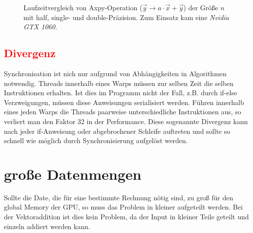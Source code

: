 		\begin{figure}[h]
  		\centering
  		\caption[Axpy mit verschiedenen Präzisionen]{Laufzeitvergleich von Axpy-Operation ($\vec{y}\rightarrow a\cdot\vec{x}+\vec{y}$) der Grö\ss e $n$ mit half, single- und double-Präzision. Zum Einsatz kam eine \textit{Nvidia GTX 1060}.}
  		\label{fig3:axpy}
		\end{figure}
		
		
		\subsection*{\textcolor{red}{Divergenz}}
		Synchronisation ist nich nur aufgrund von Abhängigkeiten in Algorithmen notwendig. \Glspl{Thread} innerhalb eines \Glspl{Warp} müssen zur selben Zeit die selben Instruktionen erhalten. Ist dies im Programm nicht der Fall, z.B. durch if-else Verzweigungen, müssen diese Anweisungen serialisiert werden. Führen innerhalb eines jeden \Glspl{Warp} die \Glspl{Thread} paarweise unterschiedliche Instruktionen aus, so verliert man den Faktor 32 in der \Gls{Performance}. Diese sogenannte Divergenz kann nach jeder if-Anweisung oder abgebrochener Schleife auftreten und sollte so schnell wie möglich durch Synchronisierung aufgelöst werden. 
		
		\section{gro\ss e Datenmengen}
		Sollte die Date, die für eine bestimmte Rechnung nötig sind, zu groß für den \Gls{global Memory} der GPU, so muss das Problem in kleiner aufgeteilt werden. Bei der Vektoraddition ist dies kein Problem, da der Input in kleiner Teile geteilt und einzeln addiert werden kann. 
		
